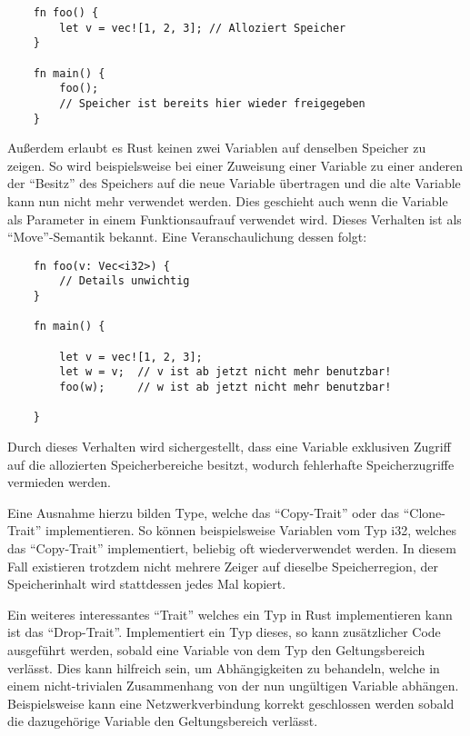 \begin{verbatim}
    fn foo() {
        let v = vec![1, 2, 3]; // Alloziert Speicher
    }

    fn main() {
        foo();
        // Speicher ist bereits hier wieder freigegeben
    }
\end{verbatim}

Außerdem erlaubt es Rust keinen zwei Variablen auf denselben Speicher zu zeigen\cite{whatIsOwnership}.
So wird beispielsweise bei einer Zuweisung einer
Variable zu einer anderen der "`Besitz"' des Speichers auf die neue Variable übertragen und die alte Variable kann nun nicht mehr
verwendet werden. Dies geschieht auch wenn die Variable als Parameter in einem Funktionsaufrauf verwendet wird.
Dieses Verhalten ist als "`Move"'-Semantik bekannt. Eine Veranschaulichung dessen folgt\cite{ownership}:

\begin{verbatim}
    fn foo(v: Vec<i32>) {
        // Details unwichtig
    }

    fn main() {
	
        let v = vec![1, 2, 3];
        let w = v;  // v ist ab jetzt nicht mehr benutzbar!
        foo(w);     // w ist ab jetzt nicht mehr benutzbar!

    }
\end{verbatim}

Durch dieses Verhalten wird sichergestellt, dass eine Variable exklusiven Zugriff auf die allozierten Speicherbereiche besitzt,
wodurch fehlerhafte Speicherzugriffe vermieden werden.

Eine Ausnahme hierzu bilden Type, welche das "`Copy-Trait"' oder das "`Clone-Trait"'
implementieren\cite{ownership}\cite{linearTypePain}.
So können beispielsweise Variablen vom Typ i32, welches
das "`Copy-Trait"' implementiert, beliebig oft wiederverwendet werden\cite{ownership}.
In diesem Fall existieren trotzdem nicht mehrere Zeiger auf dieselbe Speicherregion, der Speicherinhalt wird stattdessen jedes
Mal kopiert.

Ein weiteres interessantes "`Trait"' welches ein Typ in Rust implementieren kann ist das "`Drop-Trait"'\cite{dropTrait}.
Implementiert ein Typ dieses,
so kann zusätzlicher Code ausgeführt werden, sobald eine Variable von dem Typ den Geltungsbereich verlässt\cite{dropTrait}.
Dies kann hilfreich sein, um Abhängigkeiten zu behandeln, welche in einem nicht-trivialen Zusammenhang von der nun
ungültigen Variable abhängen.
Beispielsweise kann eine Netzwerkverbindung korrekt geschlossen werden sobald die dazugehörige Variable den
Geltungsbereich verlässt.

